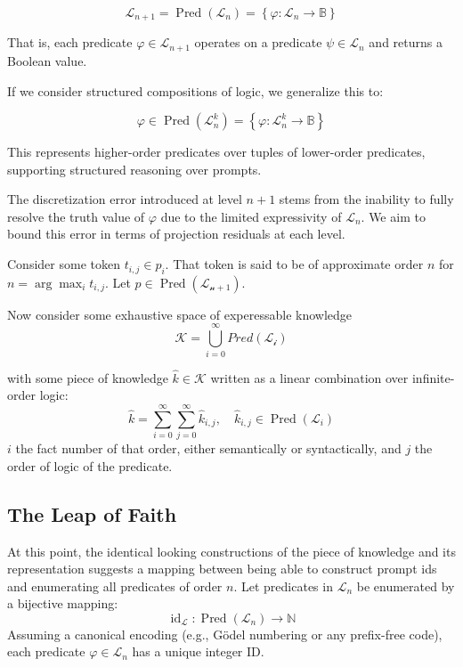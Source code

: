 \documentclass[12pt]{article}
\begin{document}
$$
\mathcal{L}_{n+1} = \operatorname{Pred}(\mathcal{L}_n) = \left\{ \varphi : \mathcal{L}_n \to \mathbb{B} \right\}
$$

That is, each predicate $\varphi \in \mathcal{L}_{n+1}$ operates on a predicate $\psi \in \mathcal{L}_n$ and returns a Boolean value.

If we consider structured compositions of logic, we generalize this to:

$$
\varphi \in \operatorname{Pred}(\mathcal{L}_n^k) = \left\{ \varphi : \mathcal{L}_n^k \to \mathbb{B} \right\}
$$

This represents higher-order predicates over tuples of lower-order predicates, supporting structured reasoning over prompts.

The discretization error introduced at level $n{+}1$ stems from the inability to fully resolve the truth value of $\varphi$ due to the limited expressivity of $\mathcal{L}_n$. We aim to bound this error in terms of projection residuals at each level.

Consider some token $t_{i,j}\in p_i$.  That token is said to be of approximate order $n$ for $n = \arg\max_{i} {t_{i,j}}$.  Let $p\in\operatorname{Pred}(\mathcal{L_{n+1}})$.

Now consider some exhaustive space of experessable knowledge
$$
\mathcal K = \bigcup_{i=0}^\infty Pred(\mathcal{L_i})
$$

with some piece of knowledge $\hat{k} \in \mathcal{K}$ written as a linear combination over infinite-order logic:
$$
\hat{k} = \sum_{i=0}^\infty \sum_{j=0}^\infty \hat{k}_{i,j}, \quad \hat{k}_{i,j} \in \operatorname{Pred}(\mathcal{L}_i)
$$
$i$ the fact number of that order, either semantically or syntactically, and $j$ the order of logic of the predicate.  

\subsection{The Leap of Faith}

At this point, the identical looking constructions of the piece of knowledge and its representation suggests a
mapping between being able to construct prompt ids and enumerating all predicates of order $n$.  Let predicates 
in $\mathcal{L}_n$ be enumerated by a bijective mapping:
$$
\operatorname{id}_{\mathcal{L}} : \operatorname{Pred}(\mathcal{L}_n) \to \mathbb{N}
$$
Assuming a canonical encoding (e.g., Gödel numbering or any prefix-free code), each predicate $\varphi \in \mathcal{L}_n$ has a unique integer ID.
\end{document}
